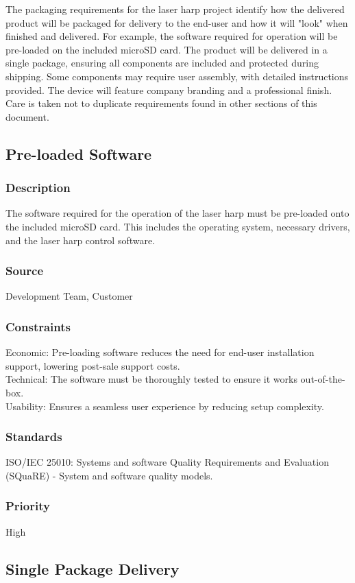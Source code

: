 The packaging requirements for the laser harp project identify how the delivered product will be packaged for delivery to the end-user and how it will "look" when finished and delivered. For example, the software required for operation will be pre-loaded on the included microSD card. The product will be delivered in a single package, ensuring all components are included and protected during shipping. Some components may require user assembly, with detailed instructions provided. The device will feature company branding and a professional finish. Care is taken not to duplicate requirements found in other sections of this document.


\subsection{Pre-loaded Software}
\subsubsection{Description}
The software required for the operation of the laser harp must be pre-loaded onto the included microSD card. This includes the operating system, necessary drivers, and the laser harp control software.
\subsubsection{Source}
Development Team, Customer
\subsubsection{Constraints}
Economic: Pre-loading software reduces the need for end-user installation support, lowering post-sale support costs.\\
Technical: The software must be thoroughly tested to ensure it works out-of-the-box.\\
Usability: Ensures a seamless user experience by reducing setup complexity.
\subsubsection{Standards}
ISO/IEC 25010: Systems and software Quality Requirements and Evaluation (SQuaRE) - System and software quality models.
\subsubsection{Priority}
High


\subsection{Single Package Delivery}
